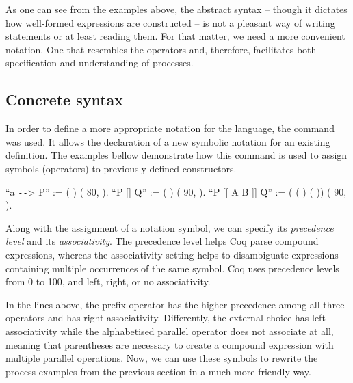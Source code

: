 As one can see from the examples above, the abstract syntax -- though it dictates how well-formed expressions are constructed -- is not a pleasant way of writing statements or at least reading them. For that matter, we need a more convenient notation. One that resembles the \CSPM{} operators and, therefore, facilitates both specification and understanding of \CSPcoq{} processes.

\subsection{Concrete syntax}

In order to define a more appropriate notation for the \CSPcoq{} language, the command  was used. It allows the declaration of a new symbolic notation for an existing definition. The examples bellow demonstrate how this command is used to assign symbols (operators) to previously defined constructors.

\begin{coqdoccode}
	\coqdocnoindent
	 ``a \texttt{-{}-}> P'' := (  ) (  80,  ).\coqdoceol
	\coqdocnoindent
	 ``P [] Q'' := (  ) (  90,  ).\coqdoceol
	\coqdocnoindent
	 ``P [[ A  B ]] Q'' := (   ( ) ( ))
	\coqdoceol\coqdocnoindent (  90,  ).\coqdoceol
\end{coqdoccode}

Along with the assignment of a notation symbol, we can specify its \emph{precedence level} and its \emph{associativity}. The precedence level helps Coq parse compound expressions, whereas the associativity setting helps to disambiguate expressions containing multiple occurrences of the same symbol. Coq uses precedence levels from 0 to 100, and left, right, or no associativity.

In the lines above, the prefix operator has the higher precedence among all three operators and has right associativity. Differently, the external choice has left associativity while the alphabetised parallel operator does not associate at all, meaning that parentheses are necessary to create a compound expression with multiple parallel operations. Now, we can use these symbols to rewrite the process examples from the previous section in a much more friendly way.

